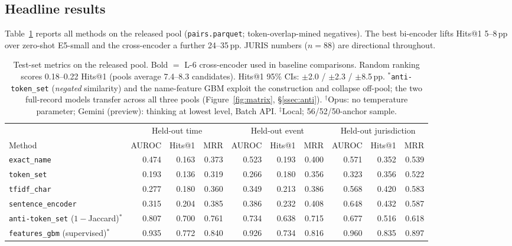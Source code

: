 \documentclass[sigconf]{acmart}
\begin{document}
\subsection{Headline results}
\label{ssec:main}

Table~\ref{tab:main_results} reports all methods on the released
pool (\texttt{pairs.parquet}; token-overlap-mined negatives). The
best bi-encoder lifts Hits@1 5--8\,pp over zero-shot E5-small and
the cross-encoder a further 24--35\,pp. JURIS numbers ($n{=}88$)
are directional throughout.

\begin{table}[t]
  \centering
  \small
  \caption{Test-set metrics on the released pool. Bold $=$ L-6
    cross-encoder used in baseline comparisons. Random ranking
    scores 0.18--0.22 Hits@1 (pools average 7.4--8.3 candidates).
    Hits@1 95\% CIs: $\pm$2.0 / $\pm$2.3 / $\pm$8.5\,pp.
    $^{*}$\texttt{anti-token\_set} (\emph{negated} similarity) and
    the name-feature GBM exploit the construction and collapse
    off-pool; the two full-record models transfer across all three
    pools (Figure~\ref{fig:matrix}, \S\ref{ssec:anti}).
    $^{\dag}$Opus: no temperature parameter; Gemini (preview):
    thinking at lowest level, Batch API. $^{\ddag}$Local;
    56/52/50-anchor sample.}
  \label{tab:main_results}
  \begin{tabular}{l rrr rrr rrr}
    \toprule
    & \multicolumn{3}{c}{Held-out time} & \multicolumn{3}{c}{Held-out event} & \multicolumn{3}{c}{Held-out jurisdiction} \\
    \cmidrule(lr){2-4}\cmidrule(lr){5-7}\cmidrule(lr){8-10}
    Method & AUROC & Hits@1 & MRR & AUROC & Hits@1 & MRR & AUROC & Hits@1 & MRR \\
    \midrule
    \texttt{exact\_name}            & 0.474 & 0.163 & 0.373 & 0.523 & 0.193 & 0.400 & 0.571 & 0.352 & 0.539 \\
    \texttt{token\_set}             & 0.193 & 0.136 & 0.319 & 0.266 & 0.180 & 0.356 & 0.323 & 0.356 & 0.522 \\
    \texttt{tfidf\_char}            & 0.277 & 0.180 & 0.360 & 0.349 & 0.213 & 0.386 & 0.568 & 0.420 & 0.583 \\
    \texttt{sentence\_encoder}      & 0.315 & 0.204 & 0.385 & 0.386 & 0.232 & 0.408 & 0.648 & 0.432 & 0.587 \\
    \texttt{anti-token\_set} ($1{-}$Jaccard)$^{*}$ & 0.807 & 0.700 & 0.761 & 0.734 & 0.638 & 0.715 & 0.677 & 0.516 & 0.618 \\
    \texttt{features\_gbm} (supervised)$^{*}$ & 0.935 & 0.772 & 0.840 & 0.926 & 0.734 & 0.816 & 0.960 & 0.835 & 0.897 \\

\end{tabular}
\end{table}
\end{document}
